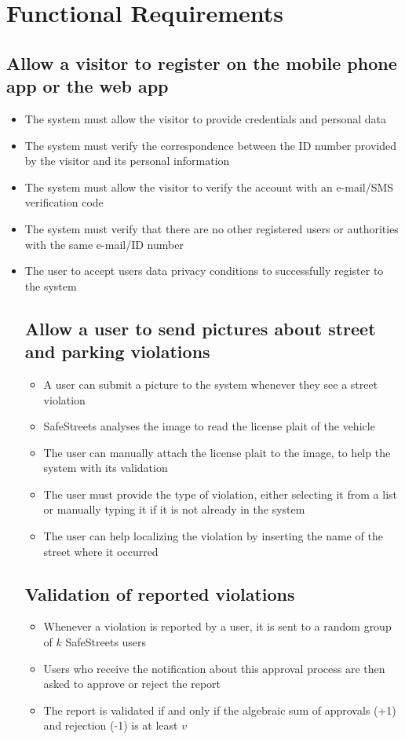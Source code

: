 \section{Functional Requirements}

\subsection{Allow a visitor to register on the mobile phone app or the web app}
\begin{itemize}
    \item The system must allow the visitor to provide credentials and personal data
    \item The system must verify the correspondence between the ID number provided by the visitor and its personal information
    \item The system must allow the visitor to verify the account with an e-mail/SMS verification code
    \item The system must verify that there are no other registered users or authorities with the same e-mail/ID number
    \item The user to accept users data privacy conditions to successfully register to the system

\subsection{Allow a user to send pictures about street and parking violations}
\begin{itemize}
    \item A user can submit a picture to the system whenever they see a street violation
    \item SafeStreets analyses the image to read the license plait of the vehicle
    \item The user can manually attach the license plait to the image, to help the system with its validation
    \item The user must provide the type of violation, either selecting it from a list or manually typing it if it is not already in the system
    \item The user can help localizing the violation by inserting the name of the street where it occurred
\end{itemize}

\subsection{Validation of reported violations}
\begin{itemize}
    \item Whenever a violation is reported by a user, it is sent to a random group of $k$ SafeStreets users
    \item Users who receive the notification about this approval process are then asked to approve or reject the report
    \item The report is validated if and only if the algebraic sum of approvals (+1) and rejection (-1) is at least $v$
\end{itemize}


\end{itemize}
